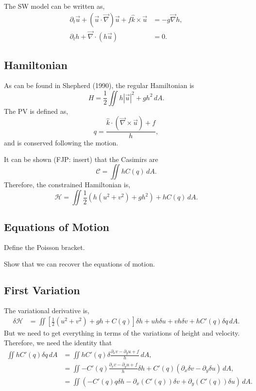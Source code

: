 \documentclass[12pt]{article}
\begin{document}
  The SW model can be written as,
  \begin{align*}
  \partial_t \vec u + (\vec u \cdot \vec \nabla) \vec u + f \hat k \times \vec u &= - g \vec \nabla h, \\
  \partial_t h + \vec\nabla \cdot \left( h \vec u \right) & = 0.
  \end{align*}

  \subsection{Hamiltonian}
    As can be found in Shepherd (1990), the regular Hamiltonian is 
    $$
    H = \frac12 \iint h | \vec u |^2 + g h^2 \, dA.
    $$
    The PV is defined as,
    $$
    q = \frac{ \hat k \cdot (\vec \nabla \times \vec u) + f}{h},
    $$
    and is conserved following the motion.  

    It can be shown (FJP: insert) that the Casimirs are
    $$
    \mathcal{C} = \iint hC(q) \, dA.
    $$
    Therefore, the constrained Hamiltonian is,
    $$
    \mathcal{H} =  \iint \frac12  \left( h (u^2 + v^2) + g h^2 \right) + h C(q) \, dA.
    $$

  \subsection{Equations of Motion}
    Define the Poisson bracket.

    Show that we can recover the equations of motion.

  \subsection{First Variation}
    The variational derivative is,
    \begin{align*}
      \delta \mathcal{H} 
      & =  \iint \left[ \frac12  (u^2 + v^2) + g h  + C(q) \right] \delta h   +  uh  \delta u + vh \delta v   + h C'(q) \delta q \, dA.
    \end{align*}
    But we need to get everything in terms of the variations of height and velocity.  Therefore, we need the identity that
    \begin{align*}
      \iint h C'(q) \delta q \, dA 
      &= \iint h C'(q) \delta \frac{ \partial_x v - \partial_y u+ f}{h} \, dA, \\
      &= \iint - C'(q) \frac{ \partial_x v - \partial_y u+ f}{h } \delta h + C'(q) \left(  \partial_x \delta v - \partial_y \delta u \right) \, dA, \\
      &= \iint \left( - C'(q) q \delta h - \partial_x ( C'(q) )  \delta v + \partial_y ( C'(q) ) \delta u \right) \, dA.
    \end{align*}
\end{document}
